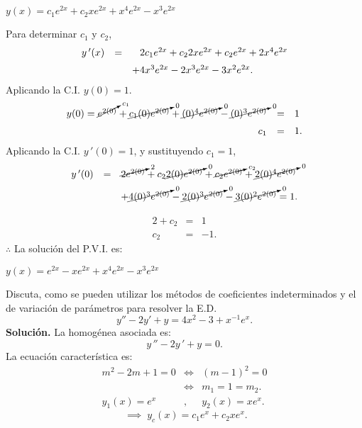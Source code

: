 \documentclass[9pt]{beamer}
\begin{document}
\begin{frame}[t]
	\begin{alertblock}{}
		\begin{center}
			\color{red} \underline{\color{black} \(y(x) = c_1e^{2x} +c_2xe^{2x} +x^4e^{2x} -x^3e^{2x}\)}
		\end{center}
		Para determinar \(c_1\) y \(c_2\),
		\[
			\begin{array}{rcl}
				y\,'(x) & = & \hphantom{+}2c_1e^{2x} +c_22xe^{2x} +c_2e^{2x} +2x^4e^{2x}\\[2mm] 
				&& + 4x^3e^{2x} -2x^3e^{2x} -3x^2e^{2x}.
			\end{array}
		\]
		Aplicando la C.I. \(y(0) = 1\).
		\[
			\begin{array}{rcl}
				y(0) = \cancelto{c_1}{e^{2(0)}} + \cancelto{0}{c_1(0) e^{2(0)}} + \cancelto{0}{(0) ^4 e^{2(0)}} - \cancelto{0}{(0) ^3e^{2(0)}}  & = & 1 \\[2mm]
				c_1 & = & 1.
			\end{array}
		\]
		Aplicando la C.I. \(y\,'(0) = 1\), y sustituyendo \(c_1=1\),
		\[
			\begin{array}{rcl}
				y\,'(0) & = & \cancelto{2}{2e^{2(0)}} + c_2 \cancelto{0}{2(0) e^{2(0)}} + \cancelto{c_2}{c_2e^{2(0)}} + \cancelto{0}{2(0)^4e^{2(0)}} \\[2mm]
				&& + \cancelto{0}{4(0) ^3e^{2(0)}} - \cancelto{0}{2(0) ^3e^{2(0)}} - \cancelto{0}{3(0) ^2e^{2(0)}} = 1.
			\end{array}
		\]
	\end{alertblock}
\end{frame}

\begin{frame}[t]
	\begin{alertblock}{}
		\[
			\begin{array}{rcl}
				2+c_2 & = & 1 \\[2mm]
				c_2 & = & -1.
			\end{array}
		\]
		\(\therefore\) \hspace{5mm} La solución del P.V.I. es:
		\begin{center}
			\color{red} \underline{\color{black} \(y(x) = e^{2x} -xe^{2x} +x^4e^{2x} -x^3e^{2x}\)}
		\end{center}
	\end{alertblock}
\end{frame}

\begin{frame}[t]
	\begin{example}
		Discuta, como se pueden utilizar los métodos de coeficientes indeterminados y el de variación de parámetros para resolver la E.D.
		\[
			y'' -2y' +y = 4x^2-3+x^{-1} e^x.
		\]
		\textbf{Solución.} La homogénea asociada es:
		\[
			y\,'' -2y\,' +y =0.
		\]
		La ecuación característica es:
		\[
			\begin{array}{rcl}
				m^2-2m+1=0 & \iff & (m-1) ^2 = 0 \\[2mm]
				& \iff & m_1 = 1 = m_2. \\[2mm]
				y_1(x) = e^x &,& y_2(x) = xe^x.
			\end{array}
		\]
		\[
			\;\implies\; y_c(x) = c_1e^x+c_2xe^x.
		\]
	\end{example}
\end{frame}
\end{document}
